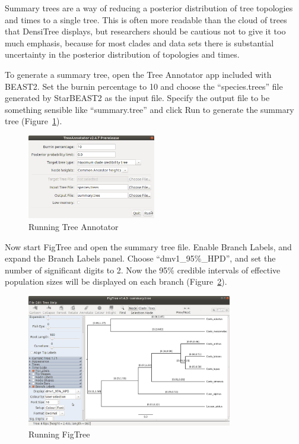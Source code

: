 \documentclass[12pt]{article}
\begin{document}
Summary trees are a way of reducing a posterior distribution of tree
topologies and times to a single tree. This is often more readable than the
cloud of trees that DensiTree displays, but researchers should be cautious not
to give it too much emphasis, because for most clades and data
sets there is substantial uncertainty in the posterior distribution of
topologies and times.

To generate a summary tree, open the Tree Annotator app included with BEAST2.
Set the burnin percentage to 10 and choose the ``species.trees'' file generated by
StarBEAST2 as the input file. Specify the output file to be something sensible
like ``summary.tree'' and click Run to generate the summary tree
(Figure~\ref{fig:treeAnnotator}).

\begin{figure}[htb!]
\centering
\includegraphics[width=0.5\textwidth]{figures/treeAnnotator.png}
\caption
{Running Tree Annotator}
\label{fig:treeAnnotator}
\end{figure}

Now start FigTree and open the summary tree file. Enable Branch Labels,
and expand the Branch Labels panel. Choose ``dmv1\_95\%\_HPD'', and set
the number of significant digits to 2. Now the 95\% credible intervals of
effective population sizes will be displayed on each branch
(Figure~\ref{fig:figtree}).

\begin{figure}[htb!]
\centering
\includegraphics[width=0.8\textwidth]{figures/figtree.png}
\caption
{Running FigTree}
\label{fig:figtree}
\end{figure}
\end{document}
